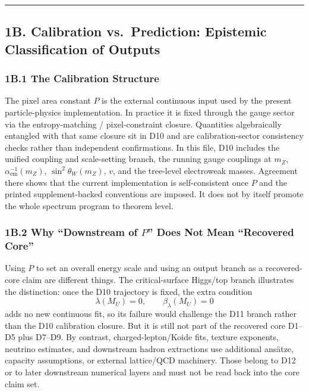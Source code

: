 \begin{center}\rule{0.5\linewidth}{0.5pt}\end{center}

\subsection{1B. Calibration vs.\ Prediction: Epistemic Classification of Outputs}\label{1b-calibration-vs-prediction}

\subsubsection{1B.1 The Calibration Structure}\label{1b1-the-calibration-structure}

The pixel area constant \(P\) is the external continuous input used by the present particle-physics implementation. In practice it is fixed through the gauge sector via the entropy-matching / pixel-constraint closure. Quantities algebraically entangled with that same closure sit in D10 and are calibration-sector consistency checks rather than independent confirmations. In this file, D10 includes the unified coupling and scale-setting branch, the running gauge couplings at \(m_Z\), \(\alpha_{\mathrm{em}}^{-1}(m_Z)\), \(\sin^2\theta_W(m_Z)\), \(v\), and the tree-level electroweak masses. Agreement there shows that the current implementation is self-consistent once \(P\) and the printed supplement-backed conventions are imposed. It does not by itself promote the whole spectrum program to theorem level.

\subsubsection{1B.2 Why ``Downstream of \(P\)'' Does Not Mean ``Recovered Core''}\label{1b2-dimensionless-independence}

Using \(P\) to set an overall energy scale and using an output branch as a recovered-core claim are different things. The critical-surface Higgs/top branch illustrates the distinction: once the D10 trajectory is fixed, the extra condition
\[
\lambda(M_U)=0,\qquad \beta_\lambda(M_U)=0
\]
adds no new continuous fit, so its failure would challenge the D11 branch rather than the D10 calibration closure. But it is still not part of the recovered core D1--D5 plus D7--D9. By contrast, charged-lepton/Koide fits, texture exponents, neutrino estimates, and downstream hadron extractions use additional ans\"atze, capacity assumptions, or external lattice/QCD machinery. Those belong to D12 or to later downstream numerical layers and must not be read back into the core claim set.


